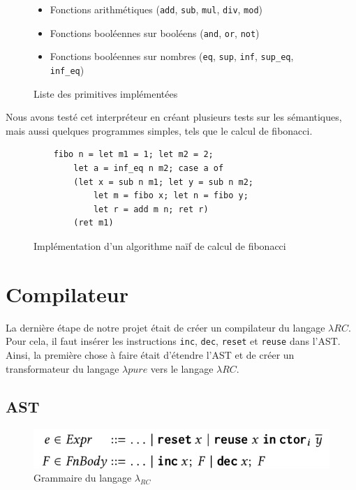 \documentclass{rapportECL}
\begin{document}
\begin{figure}[H]
	\begin{itemize}
		\item Fonctions arithmétiques (\verb|add|, \verb|sub|, \verb|mul|, \verb|div|, \verb|mod|)
		\item Fonctions booléennes sur booléens (\verb|and|, \verb|or|, \verb|not|)
		\item Fonctions booléennes sur nombres (\verb|eq|, \verb|sup|, \verb|inf|, \verb|sup_eq|, \verb|inf_eq|)
	\end{itemize}
	\label{primitives}
	\caption{Liste des primitives implémentées}
\end{figure}

\bigskip

Nous avons testé cet interpréteur en créant plusieurs tests sur les sémantiques, mais aussi quelques programmes simples, 
tels que le calcul de fibonacci.

\begin{figure}[H]
	\begin{lstlisting}
	fibo n = let m1 = 1; let m2 = 2;
		let a = inf_eq n m2; case a of
		(let x = sub n m1; let y = sub n m2; 
			let m = fibo x; let n = fibo y;
			let r = add m n; ret r)
		(ret m1)
	\end{lstlisting}
	\caption{Implémentation d'un algorithme naïf de calcul de fibonacci}
	\label{listing:fibo_naif}
\end{figure}
\FloatBarrier 

\section{Compilateur}

La dernière étape de notre projet était de créer un compilateur du langage $\lambda{RC}$. Pour cela, il faut insérer les 
instructions \verb|inc|, \verb|dec|, \verb|reset| et \verb|reuse| dans l'AST. Ainsi, la première chose à faire était
d'étendre l'AST et de créer un transformateur du langage $\lambda{pure}$ vers le langage $\lambda{RC}$.

\subsection{AST}


\begin{figure}[hbt!]
	\centering
	\includegraphics[scale=0.40]{logos/grammaire_RC.png}
	\caption{Grammaire du langage $\lambda_{RC}$}
	\label{fig:grammaire RC}
\end{figure}
\FloatBarrier 
\end{document}
